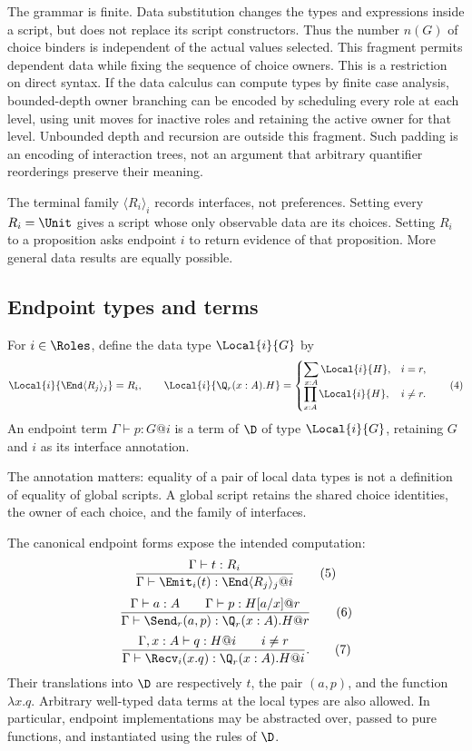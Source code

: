 The grammar is finite. Data substitution changes the types and expressions
inside a script, but does not replace its script constructors. Thus the number
$n(G)$ of choice binders is independent of the actual values selected. This
fragment permits dependent data while fixing the sequence of choice owners.
This is a restriction on direct syntax. If the data calculus can compute
types by finite case analysis, bounded-depth owner branching can be encoded
by scheduling every role at each level, using unit moves for inactive roles
and retaining the active owner for that level. Unbounded depth and recursion
are outside this fragment. Such padding is an encoding of interaction trees,
not an argument that arbitrary quantifier reorderings preserve their meaning.

The terminal family $\langle R_i\rangle_i$ records interfaces, not preferences.
Setting every $R_i=\Unit$ gives a script whose only observable data are its
choices. Setting $R_i$ to a proposition asks endpoint $i$ to return evidence of
that proposition. More general data results are equally possible.

\subsection{Endpoint types and terms}

\begin{definition}
For $i\in\Roles$, define the data type $\Local{i}{G}$ by
\[
 \Local{i}{\End\langle R_j\rangle_j}=R_i,
 \qquad
 \Local{i}{\Q_r(x:A).H}=
 \begin{cases}
   \displaystyle\sum_{x:A}\Local{i}{H},&i=r,\\[3pt]
   \displaystyle\prod_{x:A}\Local{i}{H},&i\ne r.
 \end{cases}
 \tag{4}
\]
An endpoint term $\Gamma\vdash p:G@i$ is a term of $\D$ of type
$\Local{i}{G}$, retaining $G$ and $i$ as its interface annotation.
\end{definition}

The annotation matters: equality of a pair of local data types is not a
definition of equality of global scripts. A global script retains the shared
choice identities, the owner of each choice, and the family of interfaces.

The canonical endpoint forms expose the intended computation:
\[
 \frac{\Gamma\vdash t:R_i}
      {\Gamma\vdash\Emit_i(t):\End\langle R_j\rangle_j@i}
 \tag{5}
\]
\[
 \frac{\Gamma\vdash a:A\qquad\Gamma\vdash p:H[a/x]@r}
      {\Gamma\vdash\Send_r(a,p):\Q_r(x:A).H@r}
 \tag{6}
\]
\[
 \frac{\Gamma,x:A\vdash q:H@i\qquad i\ne r}
      {\Gamma\vdash\Recv_i(x.q):\Q_r(x:A).H@i}.
 \tag{7}
\]
Their translations into $\D$ are respectively $t$, the pair $(a,p)$, and the
function $\lambda x.q$. Arbitrary well-typed data terms at the local types are
also allowed. In particular, endpoint implementations may be abstracted over,
passed to pure functions, and instantiated using the rules of $\D$.

